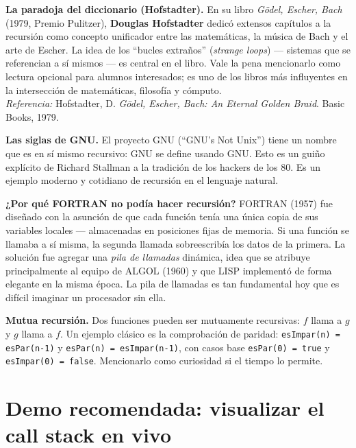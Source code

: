 \documentclass[12pt, oneside]{article}
\begin{document}
\begin{notaprofesor}

  \textbf{La paradoja del diccionario (Hofstadter).}
  En su libro \textit{Gödel, Escher, Bach} (1979, Premio Pulitzer),
  \textbf{Douglas Hofstadter} dedicó extensos capítulos a la recursión
  como concepto unificador entre las matemáticas, la música de Bach
  y el arte de Escher.  La idea de los ``bucles extraños'' (\textit{strange
  loops}) — sistemas que se referencian a sí mismos — es central en el libro.
  Vale la pena mencionarlo como lectura opcional para alumnos interesados;
  es uno de los libros más influyentes en la intersección de matemáticas,
  filosofía y cómputo.\\
  \textit{Referencia:} Hofstadter, D. \textit{Gödel, Escher, Bach: An
  Eternal Golden Braid}. Basic Books, 1979.

  \medskip
  \textbf{Las siglas de GNU.}
  El proyecto GNU (``GNU's Not Unix'') tiene un nombre que es en sí mismo
  recursivo: GNU se define usando GNU.  Esto es un guiño explícito de
  Richard Stallman a la tradición de los hackers de los 80.
  Es un ejemplo moderno y cotidiano de recursión en el lenguaje natural.

  \medskip
  \textbf{¿Por qué FORTRAN no podía hacer recursión?}
  FORTRAN (1957) fue diseñado con la asunción de que cada función tenía
  una única copia de sus variables locales — almacenadas en posiciones
  fijas de memoria.  Si una función se llamaba a sí misma, la segunda
  llamada sobreescribía los datos de la primera.  La solución fue agregar
  una \textit{pila de llamadas} dinámica, idea que se atribuye principalmente
  al equipo de ALGOL (1960) y que LISP implementó de forma elegante en la
  misma época.  La pila de llamadas es tan fundamental hoy que es difícil
  imaginar un procesador sin ella.

  \medskip
  \textbf{Mutua recursión.}
  Dos funciones pueden ser mutuamente recursivas: $f$ llama a $g$ y $g$
  llama a $f$.  Un ejemplo clásico es la comprobación de paridad:
  \texttt{esImpar(n) = esPar(n-1)} y \texttt{esPar(n) = esImpar(n-1)},
  con casos base \texttt{esPar(0) = true} y \texttt{esImpar(0) = false}.
  Mencionarlo como curiosidad si el tiempo lo permite.
\end{notaprofesor}

\section{Demo recomendada: visualizar el call stack en vivo}
\end{document}
